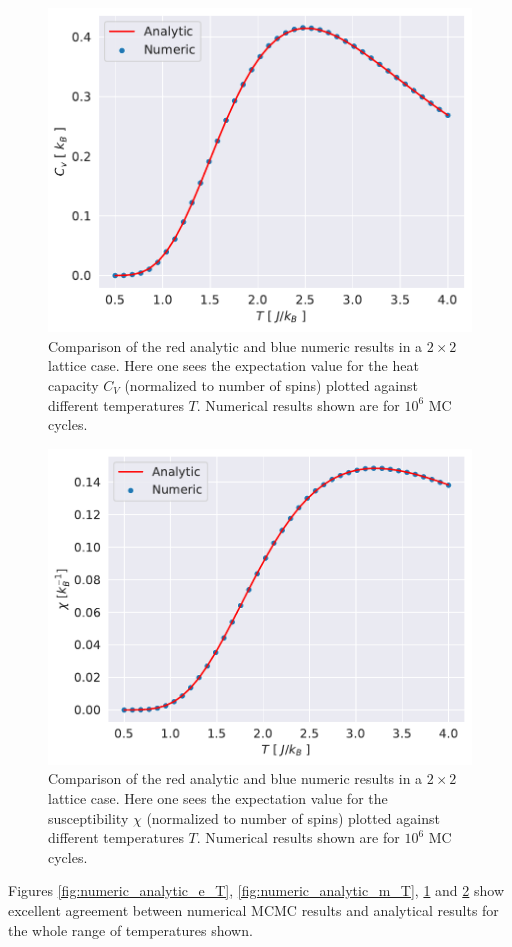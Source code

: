 \documentclass[english,notitlepage,reprint,nofootinbib]{revtex4-1}  %
\begin{document}
\begin{figure}[H]
    \centering
    \includegraphics[width=.5\textwidth]{../figures/numeric_analytic_c_v_T.pdf}
    \caption{Comparison of the red analytic and blue numeric results in a $2\times2$ lattice case. Here one sees the expectation value for the heat capacity $C_V$ (normalized to number of spins) plotted against different temperatures $T$. Numerical results shown are for $10^6$ MC cycles.}
    \label{fig:numeric_analytic_c_v_T}
\end{figure}

\begin{figure}[H]
    \centering
    \includegraphics[width=.5\textwidth]{../figures/numeric_analytic_X_T.pdf}
    \caption{Comparison of the red analytic and blue numeric results in a $2\times2$ lattice case. Here one sees the expectation value for the susceptibility $\chi$ (normalized to number of spins) plotted against different temperatures $T$. Numerical results shown are for $10^6$ MC cycles.}
    \label{fig:numeric_analytic_X_T}
\end{figure}

Figures \ref{fig:numeric_analytic_e_T}, \ref{fig:numeric_analytic_m_T}, \ref{fig:numeric_analytic_c_v_T} and \ref{fig:numeric_analytic_X_T} show excellent agreement between numerical MCMC results and analytical results for the whole range of temperatures shown.
\end{document}
